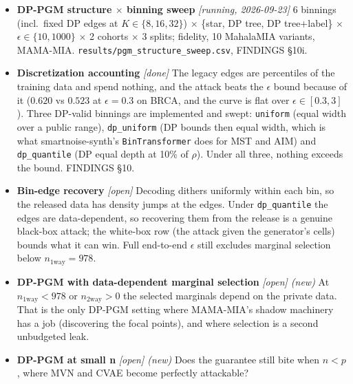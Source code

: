 \begin{itemize}
\item \textbf{DP-PGM structure $\times$ binning sweep} \emph{[running, 2026-09-23]} 6 binnings (incl.\ fixed DP edges at $K\in\{8,16,32\}$) $\times$ \{star, DP tree, DP tree+label\} $\times$ $\epsilon\in\{10,1000\}$ $\times$ 2 cohorts $\times$ 3 splits; fidelity, 10 MahalaMIA variants, MAMA-MIA. \texttt{results/pgm\_structure\_sweep.csv}, FINDINGS \S10i.
\item \textbf{Discretization accounting} \emph{[done]} The legacy edges are percentiles of the training data and spend nothing, and the attack beats the $\epsilon$ bound because of it ($0.620$ vs $0.523$ at $\epsilon=0.3$ on BRCA, and the curve is flat over $\epsilon \in [0.3, 3]$). Three DP-valid binnings are implemented and swept: \texttt{uniform} (equal width over a public range), \texttt{dp\_uniform} (DP bounds then equal width, which is what smartnoise-synth's \texttt{BinTransformer} does for MST and AIM) and \texttt{dp\_quantile} (DP equal depth at 10\% of $\rho$). Under all three, nothing exceeds the bound. FINDINGS \S10.
\item \textbf{Bin-edge recovery} \emph{[open]} Decoding dithers uniformly within each bin, so the released data has density jumps at the edges. Under \texttt{dp\_quantile} the edges are data-dependent, so recovering them from the release is a genuine black-box attack; the white-box row (the attack given the generator's cells) bounds what it can win. Full end-to-end $\epsilon$ still excludes marginal selection below $n_{1\text{way}} = 978$.
\item \textbf{DP-PGM with data-dependent marginal selection} \emph{[open] (new)} At $n_{1\text{way}} < 978$ or $n_{2\text{way}} > 0$ the selected marginals depend on the private data. That is the only DP-PGM setting where MAMA-MIA's shadow machinery has a job (discovering the focal points), and where selection is a second unbudgeted leak.
\item \textbf{DP-PGM at small n} \emph{[open] (new)} Does the guarantee still bite when $n < p$, where MVN and CVAE become perfectly attackable?
\end{itemize}

